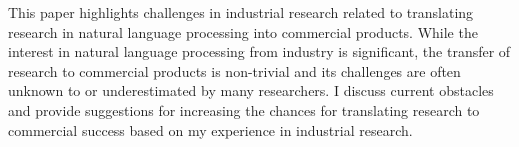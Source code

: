 This paper highlights challenges in industrial research related to translating research in natural language processing into commercial products. While the interest in natural language processing from industry is significant, the transfer of research to commercial products is non-trivial and its challenges are often unknown to or underestimated by many researchers. I discuss current obstacles and provide suggestions for increasing the chances for translating research to commercial success based on my experience in industrial research.
